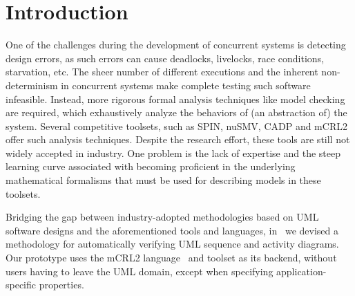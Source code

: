 \documentclass[letter]{llncs}
\begin{document}
\section{Introduction}
\vspace{-10 pt}

\label{sec:Introduction}
One of the challenges during the development of concurrent systems is detecting
design errors, as such errors can cause deadlocks, livelocks, race conditions,
starvation, etc. The sheer number of different executions and the
inherent non-determinism in concurrent systems make complete testing such software
infeasible. Instead, more rigorous formal analysis techniques like
model checking are required, which exhaustively analyze the behaviors of 
(an abstraction of) the system. Several competitive 
toolsets, such as SPIN, nuSMV, CADP and mCRL2 offer such analysis techniques.
Despite the research effort, these tools are still not widely accepted
in industry. One problem is the lack of expertise and the steep learning
curve associated with becoming proficient in the underlying mathematical
formalisms that must be used for describing models in these toolsets.

Bridging the gap between industry-adopted methodologies based on
UML software designs and the aforementioned tools and languages,
in~\cite{DBLP:dblp_conf/nfm/RemenskaTWHVCB13} we devised a
methodology for automatically verifying UML 
sequence and activity diagrams.  Our prototype uses the mCRL2
language~\cite{FormalLanguagemCRL2} and toolset as its backend,
without users having to leave the UML domain, except when specifying
application-specific properties.


\end{document}

